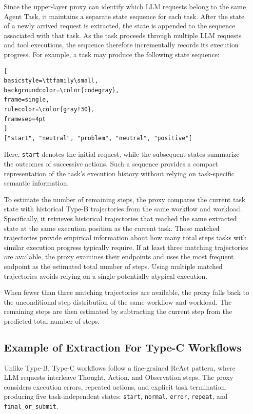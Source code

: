Since the upper-layer proxy can identify which LLM requests belong to the same Agent Task, it maintains a separate state sequence for each task. After the state of a newly arrived request is extracted, the state is appended to the sequence associated with that task. As the task proceeds through multiple LLM requests and tool executions, the sequence therefore incrementally records its execution progress. For example, a task may produce the following state sequence:
\begin{lstlisting}[
basicstyle=\ttfamily\small,
backgroundcolor=\color{codegray},
frame=single,
rulecolor=\color{gray!30},
framesep=4pt
]
["start", "neutral", "problem", "neutral", "positive"]
\end{lstlisting}
Here, \texttt{start} denotes the initial request, while the subsequent states summarize the outcomes of successive actions. Such a sequence provides a compact representation of the task's execution history without relying on task-specific semantic information.

To estimate the number of remaining steps, the proxy compares the current task state with historical Type-B trajectories from the same workflow and workload. Specifically, it retrieves historical trajectories that reached the same extracted state at the same execution position as the current task. These matched trajectories provide empirical information about how many total steps tasks with similar execution progress typically require. If at least three matching trajectories are available, the proxy examines their endpoints and uses the most frequent endpoint as the estimated total number of steps. Using multiple matched trajectories avoids relying on a single potentially atypical execution.

When fewer than three matching trajectories are available, the proxy falls back to the unconditional step distribution of the same workflow and workload. The remaining steps are then estimated by subtracting the current step from the predicted total number of steps.



\subsection{Example of Extraction For Type-C Workflows}

Unlike Type-B, Type-C workflows follow a fine-grained ReAct pattern,
where LLM requests interleave Thought, Action, and Observation steps.
The proxy considers execution errors, repeated actions, and explicit
task termination, producing five task-independent states:
\texttt{start}, \texttt{normal}, \texttt{error}, \texttt{repeat}, and
\texttt{final\_or\_submit}. 

